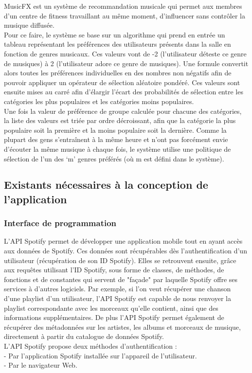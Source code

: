 \documentclass[12pt, openany]{report}
\begin{document}
MusicFX \cite {MusicFX} est un système de recommandation musicale qui permet aux membres d’un centre de fitness travaillant au même moment, d’influencer sans contrôler la musique diffusée.
\\
Pour ce faire, le système se base sur un algorithme qui prend en entrée un tableau représentant les préférences des utilisateurs présents dans la salle en fonction de genres musicaux. Ces valeurs vont de -2 (l’utilisateur déteste ce genre de musiques) à 2 (l’utilisateur adore ce genre de musiques). Une formule convertit alors toutes les préférences individuelles en des nombres non négatifs afin de pouvoir appliquer un opérateur de sélection aléatoire pondéré. Ces valeurs sont ensuite mises au carré afin d’élargir l’écart des probabilités de sélection entre les catégories les plus populaires et les catégories moins populaires. 
\\
Une fois la valeur de préférence de groupe calculée pour chacune des catégories, la liste des valeurs est triée par ordre décroissant, afin que la catégorie la plus populaire soit la première et la moins populaire soit la dernière. Comme la plupart des gens s’entraînent à la même heure et n’ont pas forcément envie d’écouter la même musique à chaque fois, le système utilise une politique de sélection de l’un des ‘m’ genres préférés (où m est défini dans le système).

\subsection{Existants nécessaires à la conception de l'application}

\subsubsection{Interface de programmation}

L'API Spotify permet de développer une application mobile tout en ayant accès aux données de Spotify. Ces données sont récupérables dès l'authentification d'un utilisateur (récupération de son ID Spotify). Elles se retrouvent ensuite, grâce aux requêtes utilisant l'ID Spotify, sous forme de classes, de méthodes, de fonctions et de constantes qui servent de "façade" par laquelle Spotify offre ses services à d'autres logiciels. Par exemple, si l'on veut récupérer une chanson d'une playlist d'un utilisateur, l'API Spotify est capable de nous renvoyer la playlist correspondante avec les morceaux qu'elle contient, ainsi que des informations supplémentaires. De plus l'API Spotify permet également de récupérer des métadonnées
sur les artistes, les albums et morceaux de musique, directement à partir du catalogue de données Spotify.
\\
L'API Spotify propose deux méthodes d'authentification :
\\- Par l'application Spotify installée sur l'appareil de l'utilisateur.
\\- Par le navigateur Web.
\end{document}
